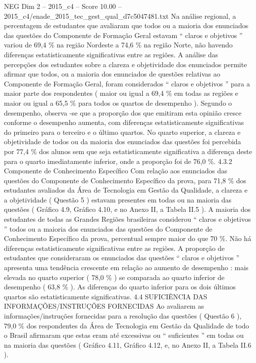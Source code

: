 \begin{textsample}{NEG Dim 2 – 2015\_c4 – Score 10.00 – 2015\_c4/enade\_2015\_tec\_gest\_qual\_d7c5047481.txt}
Na análise regional, a percentagem de estudantes que avaliaram que todos ou a maioria dos enunciados das questões do Componente de Formação Geral estavam “ claros e objetivos ” variou de 69,4 \% na região Nordeste a 74,6 \% na região Norte, não havendo diferenças estatisticamente significativas entre as regiões.
A análise das percepções dos estudantes sobre a clareza e objetividade dos enunciados permite afirmar que todos, ou a maioria dos enunciados de questões relativas ao Componente de Formação Geral, foram considerados “ claros e objetivos ” para a maior parte dos respondentes ( maior ou igual a 69,4 \% em todas as regiões e maior ou igual a 65,5 \% para todos os quartos de desempenho ).
Segundo o desempenho, observa -se que a proporção dos que emitiram esta opinião cresce conforme o desempenho aumenta, com diferenças estatisticamente significativas do primeiro para o terceiro e o último quartos.
No quarto superior, a clareza e objetividade de todos ou da maioria dos enunciados das questões foi percebida por 77,4 \% dos alunos sem que seja estatisticamente significativa a diferença deste para o quarto imediatamente inferior, onde a proporção foi de 76,0 \%. 4.3.2 Componente de Conhecimento Específico Com relação aos enunciados das questões do Componente de Conhecimento Específico da prova, para 71,8 \% dos estudantes avaliados da Área de Tecnologia em Gestão da Qualidade, a clareza e a objetividade ( Questão 5 ) estavam presentes em todas ou na maioria das questões ( Gráfico 4.9, Gráfico 4.10, e no Anexo II, a Tabela II.5 ).
A maioria dos estudantes de todas as Grandes Regiões brasileiras considerou “ claros e objetivos ” todos ou a maioria dos enunciados das questões do Componente de Conhecimento Específico da prova, percentual sempre maior do que 70 \%.
Não há diferenças estatisticamente significativas entre as regiões.
A proporção de estudantes que consideraram os enunciados das questões “ claros e objetivos ” apresenta uma tendência crescente em relação ao aumento de desempenho : mais elevada no quarto superior ( 78,0 \% ) se comparada ao quarto inferior de desempenho ( 63,8 \% ).
As diferenças do quarto inferior para os dois últimos quartos são estatisticamente significativas. 4.4 SUFICIÊNCIA DAS INFORMAÇÕES/INSTRUÇÕES FORNECIDAS Ao avaliarem as informações/instruções fornecidas para a resolução das questões ( Questão 6 ), 79,0 \% dos respondentes da Área de Tecnologia em Gestão da Qualidade de todo o Brasil afirmaram que estas eram até excessivas ou “ suficientes ” em todas ou na maioria das questões ( Gráfico 4.11, Gráfico 4.12, e, no Anexo II, a Tabela II.6 ).

\end{textsample}
